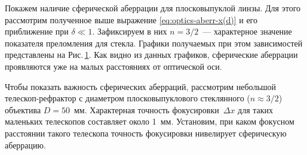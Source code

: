 \begin{figure}
    \centering
    \vspace{-.5pc}
    \caption{}
    \label{pic:sphere-aberrations-lens-plot}
\end{figure}
Покажем наличие сферической аберрации для плосковыпуклой линзы. Для этого рассмотрим полученное выше выражение \eqref{eq:optics-aberr-x(d)} и его приближение при $\delta \ll 1$. Зафиксируем в них $n=3/2$~--- характерное значение показателя преломления для стекла. Графики получаемых при этом зависимостей представлены на Рис.\,\ref{pic:sphere-aberrations-lens-plot}. Как видно из данных графиков, сферические аберрации проявляются уже на малых расстояниях от оптической оси.

Чтобы показать важность сферических аберраций, рассмотрим небольшой телескоп-рефрактор с диаметром плос\-ко\-вы\-пук\-ло\-во\-го стеклянного ($n \approx 3/2$) объектива $D = 50$~мм. Характерная точность фокусировки~$\Delta x$ для таких маленьких телескопов составляет около 1~мм. Установим, при каком фокусном расстоянии такого телескопа точность фокусировки нивелирует сферическую аберрацию.

